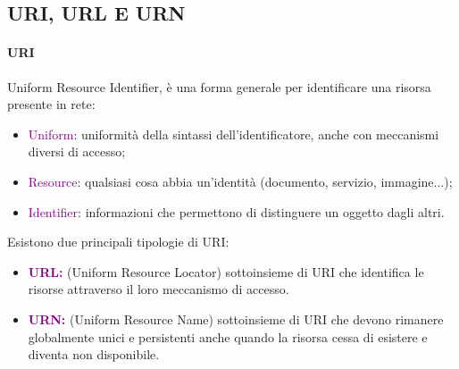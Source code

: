 \subsection{URI, URL E URN}
\paragraph{URI} Uniform Resource Identifier, è una forma generale per identificare una risorsa presente in rete:
\begin{itemize}
    \item \textcolor{purple}{Uniform}: uniformità della sintassi dell’identificatore, anche con meccanismi diversi di accesso;
    \item \textcolor{purple}{Resource}: qualsiasi cosa abbia un'identità (documento, servizio, immagine...);
    \item \textcolor{purple}{Identifier}: informazioni che permettono di distinguere un oggetto dagli altri.
\end{itemize} 
Esistono due principali tipologie di URI:
\begin{itemize}
    \item \textbf{\textcolor{purple}{URL:}} (Uniform Resource Locator) sottoinsieme di URI che identifica  le risorse attraverso il loro meccanismo di accesso.
    \item \textbf{\textcolor{purple}{URN:}} (Uniform Resource Name) sottoinsieme di URI che devono rimanere globalmente unici e persistenti anche quando la risorsa cessa di esistere e diventa non disponibile.
\end{itemize}


